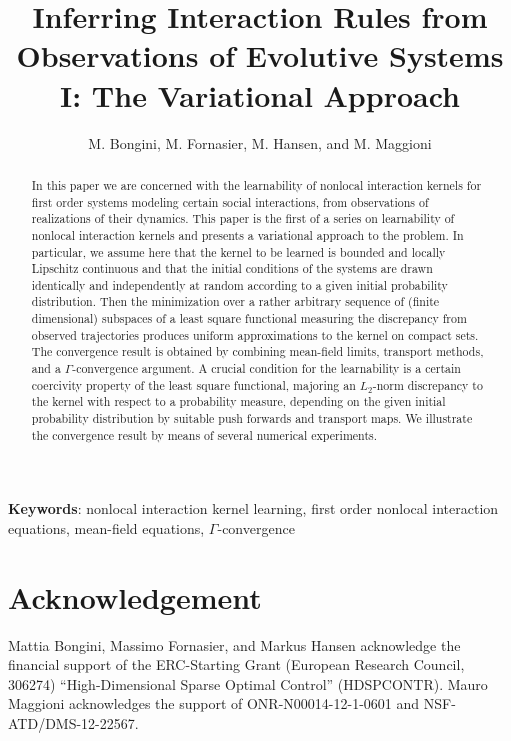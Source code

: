 \documentclass[A4paper,11pt]{article}
\title{Inferring Interaction Rules from Observations of Evolutive Systems I: The Variational Approach}
\author{M. Bongini, M. Fornasier, M. Hansen, and M. Maggioni}
\date{}
\theoremstyle{definition}
\begin{document}
\maketitle

\begin{abstract}
In this paper we are concerned with the  learnability of nonlocal interaction kernels for  first order systems modeling certain social interactions, from observations of realizations of their dynamics. This paper is the first  of a series  on learnability of nonlocal interaction kernels and presents a variational approach to the problem. In particular, we assume here that  the kernel to be learned is bounded and locally Lipschitz continuous and that the initial conditions of the systems are drawn identically and independently at random according to a given initial probability distribution. Then the minimization over a rather arbitrary  sequence of (finite dimensional) subspaces of a least square functional measuring the discrepancy from observed trajectories  produces uniform approximations to the kernel on compact sets. The convergence result is obtained by combining mean-field limits, transport methods, and a $\Gamma$-convergence argument. A crucial condition for the learnability is a certain coercivity property of the least square functional, majoring an $L_2$-norm discrepancy to the kernel with respect to a probability measure, depending on the given initial probability distribution by suitable push forwards and transport maps. We illustrate the convergence result by means of several numerical experiments. 
\end{abstract}
{\bf Keywords}: nonlocal interaction kernel learning, first order nonlocal interaction equations, mean-field equations, $\Gamma$-convergence

\bigskip

\tableofcontents














\section*{Acknowledgement}

Mattia Bongini, Massimo Fornasier, and Markus Hansen acknowledge the financial support of the ERC-Starting Grant (European Research Council, 306274) “High-Dimensional Sparse Optimal Control” (HDSPCONTR). Mauro Maggioni acknowledges the support of ONR-N00014-12-1-0601 and NSF-ATD/DMS-12-22567.
\end{document}
